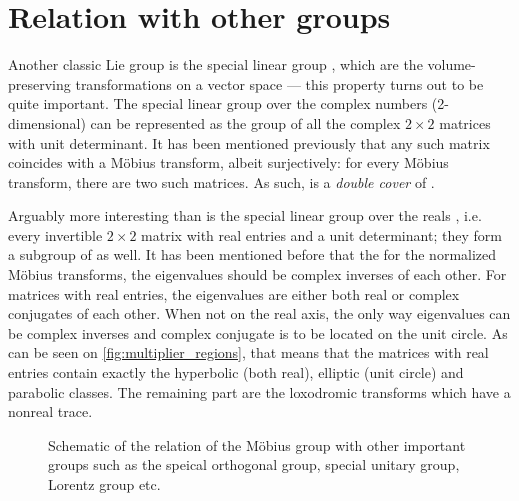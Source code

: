 \section{Relation with other groups}
Another classic Lie group is the special linear group , which are the volume-preserving transformations on a vector space --- this property turns out to be quite important. The special linear group over the complex numbers (2-dimensional)  can be represented as the group of all the complex \(2\times2\) matrices with unit determinant. It has been mentioned previously that any such matrix coincides with a Möbius transform, albeit surjectively: for every Möbius transform, there are two such matrices. As such,  is a \emph{double cover} of \moebiusgroup.

Arguably more interesting than  is the special linear group over the reals , i.e. every invertible \(2 \times 2\) matrix with real entries and a unit determinant; they form a subgroup of  as well. It has been mentioned before that the for the normalized Möbius transforms, the eigenvalues should be complex inverses of each other. For matrices with real entries, the eigenvalues are either both real or complex conjugates of each other. When not on the real axis, the only way eigenvalues can be complex inverses and complex conjugate is to be located on the unit circle. As can be seen on \cref{fig:multiplier_regions}, that means that the matrices with real entries contain exactly the hyperbolic (both real), elliptic (unit circle) and parabolic classes. The remaining part are the loxodromic transforms which have a nonreal trace.


\begin{figure}
    \centering
    
    \caption{Schematic of the relation of the Möbius group with other important groups such as the speical orthogonal group, special unitary group, Lorentz group etc.}
\end{figure}

